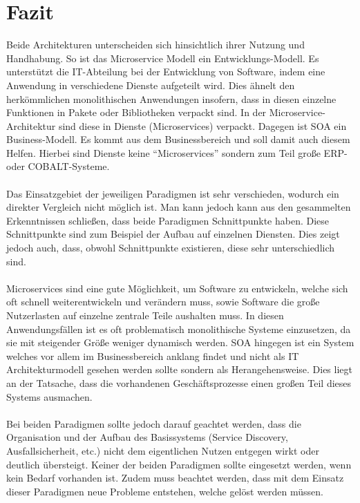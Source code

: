 \section{Fazit}
\label{sec:Fazit}
Beide Architekturen unterscheiden sich hinsichtlich ihrer Nutzung und Handhabung. So ist das Microservice Modell ein Entwicklungs-Modell. Es unterstützt die IT-Abteilung bei der Entwicklung von Software, indem eine Anwendung in verschiedene Dienste aufgeteilt wird. Dies ähnelt den herkömmlichen monolithischen Anwendungen insofern, dass in diesen einzelne Funktionen in Pakete oder Bibliotheken verpackt sind. In der Microservice-Architektur sind diese in Dienste (Microservices) verpackt. Dagegen ist SOA ein Business-Modell. Es kommt aus dem Businessbereich und soll damit auch diesem Helfen. Hierbei sind Dienste keine "`Microservices"' sondern zum Teil große ERP- oder COBALT-Systeme.
\\\\
Das Einsatzgebiet der jeweiligen Paradigmen ist sehr verschieden, wodurch ein direkter Vergleich nicht möglich ist. Man kann jedoch kann aus den gesammelten Erkenntnissen schließen, dass beide Paradigmen Schnittpunkte haben. Diese Schnittpunkte sind zum Beispiel der Aufbau auf einzelnen Diensten. Dies zeigt jedoch auch, dass, obwohl Schnittpunkte existieren, diese sehr unterschiedlich sind.
\\\\
Microservices sind eine gute Möglichkeit, um Software zu entwickeln, welche sich oft schnell weiterentwickeln und verändern muss, sowie Software die große Nutzerlasten auf einzelne zentrale Teile aushalten muss. In diesen Anwendungsfällen ist es oft problematisch monolithische Systeme einzusetzen, da sie mit steigender Größe weniger dynamisch werden.
SOA hingegen ist ein System welches vor allem im Businessbereich anklang findet und nicht als IT Architekturmodell gesehen werden sollte sondern als Herangehensweise. Dies liegt an der Tatsache, dass die vorhandenen Geschäftsprozesse einen großen Teil dieses Systems ausmachen.
\\\\
Bei beiden Paradigmen sollte jedoch darauf geachtet werden, dass die Organisation und der Aufbau des Basissystems (Service Discovery, Ausfallsicherheit, etc.) nicht dem eigentlichen Nutzen entgegen wirkt oder deutlich übersteigt. Keiner der beiden Paradigmen sollte eingesetzt werden, wenn kein Bedarf vorhanden ist. Zudem muss beachtet werden, dass mit dem Einsatz dieser Paradigmen neue Probleme entstehen, welche gelöst werden müssen.
